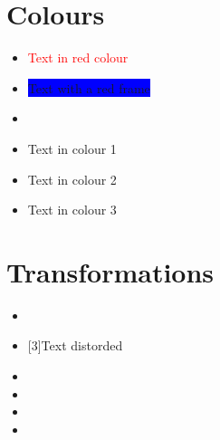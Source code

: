 \documentclass[10pt]{article}
\begin{document}
%
\section{Colours}
\begin{itemize}
\item \textcolor{red}{Text in red colour}
\item \colorbox{blue}{Text with a red frame}
\item {}
\item \textcolor{color1}{Text in colour 1}
\item \textcolor{color2}{Text in colour 2}
\item \textcolor{color3}{Text in colour 3}
\end{itemize}
%
\section{Transformations}
\begin{itemize}
\item \scalebox{2}{Text scaled twice}
\item \scalebox{2}[3]{Text distorded}
\item {}
\item {}
\item {}
\item {}
\end{itemize}

%
\end{document}
